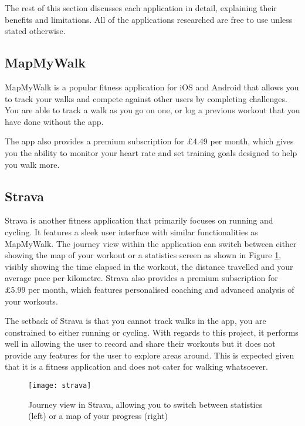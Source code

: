 The rest of this section discusses each application in detail, explaining their benefits and limitations. All of the applications researched are free to use unless stated otherwise.


\subsection{MapMyWalk}

MapMyWalk \cite{Map} is a popular fitness application for iOS and Android that allows you to track your walks and compete against other users by completing challenges. You are able to track a walk as you go on one, or log a previous workout that you have done without the app.

The app also provides a premium subscription for \pounds4.49 per month, which gives you the ability to monitor your heart rate and set training goals designed to help you walk more.

\subsection{Strava}

Strava \cite{StravaInc.} is another fitness application that primarily focuses on running and cycling. It features a sleek user interface with similar functionalities as MapMyWalk. The journey view within the application can switch between either showing the map of your workout or a statistics screen as shown in Figure \ref{fig:strava}, visibly showing the time elapsed in the workout, the distance travelled and your average pace per kilometre. Strava also provides a premium subscription for \pounds5.99 per month, which features personalised coaching and advanced analysis of your workouts.

The setback of Strava is that you cannot track walks in the app, you are constrained to either running or cycling. With regards to this project, it performs well in allowing the user to record and share their workouts but it does not provide any features for the user to explore areas around. This is expected given that it is a fitness application and does not cater for walking whatsoever.

\begin{figure}[hbt]
  \centering
  \texttt{[image: strava]}
  \caption{Journey view in Strava, allowing you to switch between statistics (left) or a map of your progress (right)}
  \label{fig:strava}
\end{figure}


